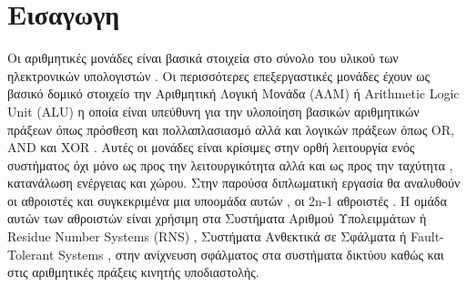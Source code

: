 
\section{Εισαγωγη}

Οι αριθμητικές μονάδες είναι βασικά στοιχεία στο σύνολο του υλικού των ηλεκτρονικών υπολογιστών . Οι περισσότερες επεξεργαστικές μονάδες έχουν ως βασικό δομικό στοιχείο την Αριθμητική Λογική Μονάδα (ΑΛΜ) ή Arithmetic Logic Unit (ALU) η οποία είναι υπεύθυνη για την υλοποίηση βασικών αριθμητικών πράξεων όπως πρόσθεση και πολλαπλασιασμό αλλά και λογικών πράξεων όπως OR, AND και XOR . Αυτές οι μονάδες είναι κρίσιμες στην ορθή λειτουργία ενός συστήματος όχι μόνο ως προς την λειτουργικότητα αλλά και ως προς την ταχύτητα , κατανάλωση ενέργειας και χώρου. Στην παρούσα διπλωματική εργασία θα αναλυθούν οι αθροιστές και συγκεκριμένα μια υποομάδα αυτών , οι 2n-1 αθροιστές . Η ομάδα αυτών των αθροιστών είναι χρήσιμη στα Συστήματα Αριθμού Υπολειμμάτων ή Residue Number Systems (RNS) , Συστήματα Ανθεκτικά σε Σφάλματα ή Fault-Tolerant Systems , στην ανίχνευση σφάλματος στα συστήματα δικτύου καθώς και στις αριθμητικές πράξεις κινητής υποδιαστολής.